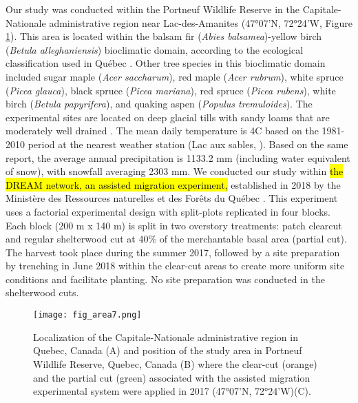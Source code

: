 Our study was conducted within the Portneuf Wildlife Reserve in the Capitale-Nationale administrative region near Lac-des-Amanites (47°07’N, 72°24’W, Figure \ref{fig:area}). 
This area is located within the balsam fir (\textit{Abies balsamea})-yellow birch (\textit{Betula alleghaniensis}) bioclimatic domain, according to the ecological classification used in Québec \citep{saucierChapitreEcologieForestiere2009}. 
Other tree species in this bioclimatic domain included sugar maple (\textit{Acer saccharum}), red maple (\textit{Acer rubrum}), white spruce (\textit{Picea glauca}), black spruce (\textit{Picea mariana}), red spruce (\textit{Picea rubens}), white birch (\textit{Betula papyrifera}), and quaking aspen (\textit{Populus tremuloides}). 
The experimental sites are located on deep glacial tills with sandy loams that are moderately well drained \citep{CanadianSystemSoil1998}. 
The mean daily temperature is 4C based on the 1981-2010 period at the nearest weather station (Lac aux sables, \citealp{environmentcanadaCanadianClimateNormals2019}). 
Based on the same report, the average annual precipitation is 1133.2 mm (including water equivalent of snow), with snowfall averaging 2303 mm. 
We conducted our study within \hl{the DREAM network, an assisted migration experiment,} established in 2018 by the Ministère des Ressources naturelles et des Forêts du Québec \citep{royoDesiredREgenerationAssisted2023,Dumais2025Translocatedsouthern}. 
This experiment uses a factorial experimental design with split-plots replicated in four blocks. 
Each block (200 m x 140 m) is split in two overstory treatments:  patch clearcut and regular shelterwood cut at 40\% of the merchantable basal area (partial cut). 
The harvest took place during the summer 2017, followed by a site preparation by trenching in June 2018 within the clear-cut areas to create more uniform site conditions and facilitate planting. 
No site preparation was conducted in the shelterwood cuts.


\pagebreak

\begin{figure}[ht!]
	\centering
	\texttt{[image: fig\_area7.png]}
	\caption[Localization of the Capitale-Nationale administrative region in Quebec, Canada and position of the study area near Lac des Amanites in Portneuf Wildlife Reserve, Quebec, Canada.]
  {Localization of the Capitale-Nationale administrative region in Quebec, Canada (A) and position of the study area in Portneuf Wildlife Reserve, Quebec, Canada (B) where the clear-cut (orange) and the partial cut (green) associated with the assisted migration experimental system were applied in 2017 (47°07'N, 72°24'W)(C).}
	\label{fig:area}
	\end{figure}  

